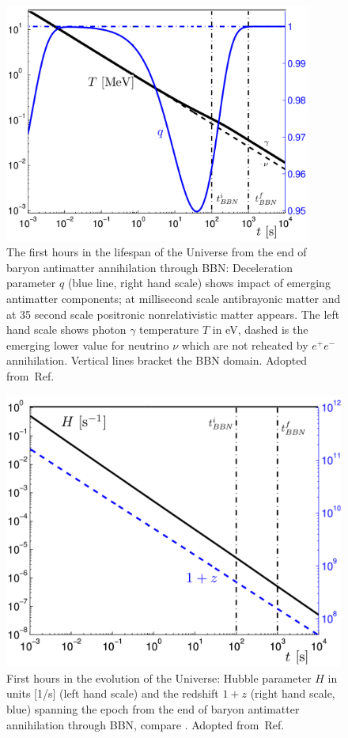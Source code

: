 {%
\begin{figure}
\centerline{\includegraphics[width=0.90\textwidth]{01-introduction/Figures/TqBBN.png}}
\caption{The first hours in the lifespan of the Universe  from the end of baryon antimatter annihilation through BBN: Deceleration parameter $q$ (blue line, right hand scale) shows impact of emerging antimatter components; at millisecond scale antibrayonic matter and at 35 second scale positronic nonrelativistic matter appears. The left hand scale shows photon $\gamma$ temperature $T$ in eV, dashed is the emerging lower value for neutrino $\nu$ which are not reheated by $e^+e^-$ annihilation. Vertical lines bracket the BBN domain. Adopted from~Ref.\,\cite{Rafelski:2013yka}  
\label{fig:BBN}}
\end{figure}

\begin{figure}
\centerline{\includegraphics[width=0.90\linewidth]{01-introduction/Figures/HzBBN.png}} 
\caption{First hours in the evolution of the Universe: Hubble parameter $H$ in units [1/s] (left hand scale) and the redshift $1+z$ (right hand scale, blue) spanning the epoch from  the end of baryon antimatter annihilation through BBN, compare . Adopted from~Ref.\,\cite{Rafelski:2013yka} 
\label{fig:BBN1}}
\end{figure}

}
